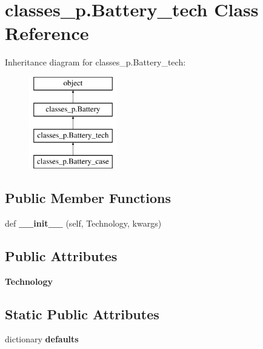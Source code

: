 \hypertarget{classclasses__p_1_1_battery__tech}{}\section{classes\+\_\+p.\+Battery\+\_\+tech Class Reference}
\label{classclasses__p_1_1_battery__tech}
Inheritance diagram for classes\+\_\+p.\+Battery\+\_\+tech\+:\begin{figure}[H]
\begin{center}
\leavevmode
\includegraphics[height=4.000000cm]{classclasses__p_1_1_battery__tech}
\end{center}
\end{figure}
\subsection*{Public Member Functions}
\begin{DoxyCompactItemize}
\item 
\mbox{\label{classclasses__p_1_1_battery__tech_af413bb6ff8d8af74dcc9ead8a25094ff}} 
def {\bfseries \+\_\+\+\_\+init\+\_\+\+\_\+} (self, Technology, kwargs)
\end{DoxyCompactItemize}
\subsection*{Public Attributes}
\begin{DoxyCompactItemize}
\item 
\mbox{\label{classclasses__p_1_1_battery__tech_a2424ab61ec6d83cd57ddeb45d5ff5a2c}} 
{\bfseries Technology}
\end{DoxyCompactItemize}
\subsection*{Static Public Attributes}
\begin{DoxyCompactItemize}
\item 
dictionary {\bfseries defaults}
\end{DoxyCompactItemize}


